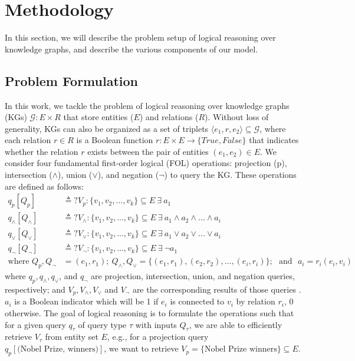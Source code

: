 \documentclass{article} %
\begin{document}
\section{Methodology}
\label{sec:method}
In this section, we will describe the problem setup of logical reasoning over knowledge graphs, and describe the various components of our model.
\subsection{Problem Formulation}
\label{sec:problem}
In this work, we tackle the problem of logical reasoning over knowledge graphs (KGs) $\mathcal{G}:E\times R$ that store entities ($E$) and relations ($R$). Without loss of generality, KGs can also be organized as a set of triplets $\langle e_1,r,e_2\rangle \subseteq \mathcal{G}$, where each relation $r \in R$ is a Boolean function $r:E\times E \rightarrow \{True,False\}$ that indicates whether the relation $r$ exists between the pair of entities $(e_1, e_2) \in E$. We consider four fundamental first-order logical (FOL) operations: projection (p), intersection ($\wedge$), union ($\vee$), and negation ($\neg$) to query the KG. These operations are defined as follows:
\begin{align}
    q_p[Q_p] &\triangleq?V_p: \{v_1,v_2,...,v_k\} \subseteq E ~ \exists ~ a_1\\
    q_\wedge[Q_\wedge] &\triangleq?V_\wedge: \{v_1,v_2,...,v_k\}  \subseteq E ~ \exists ~ a_1 \wedge a_2 \wedge ... \wedge a_i\\
    q_\vee[Q_\vee] &\triangleq?V_\vee: \{v_1,v_2,...,v_k\} \subseteq E ~ \exists ~ a_1 \vee a_2 \vee ... \vee a_i\\
    q_\neg[Q_\neg] &\triangleq?V_\neg: \{v_1,v_2,...,v_k\} \subseteq E ~ \exists ~ \neg a_1\\
    \text{where }Q_p,Q_\neg & = (e_1,r_1);~ Q_\wedge, Q_\vee = \{(e_1,r_1),(e_2,r_2),...,(e_i,r_i)\};\nonumber 
    \text{~~and~ }a_i = r_i(e_i,v_i)
\end{align}
where $q_p, q_\wedge, q_\vee$, and $q_\neg$ are projection, intersection, union, and negation queries, respectively; and $V_p, V_\wedge, V_\vee$ and $V_\neg$ are the corresponding results of those queries \citep{arakelyan2021complex,choudhary2021probabilistic}. {$a_i$ is a Boolean indicator which will be 1 if $e_i$ is connected to $v_i$ by relation $r_i$, 0 otherwise.} The goal of logical reasoning is to formulate the operations such that for a given query $q_\tau$ of query type $\tau$ with inputs $Q_\tau$, we are able to efficiently retrieve $V_\tau$ from entity set $E$, e.g., for a projection query $q_p[\text{(Nobel Prize, winners)}]$, we want to retrieve $V_p = \{\text{Nobel Prize winners}\} \subseteq E$.
\end{document}
